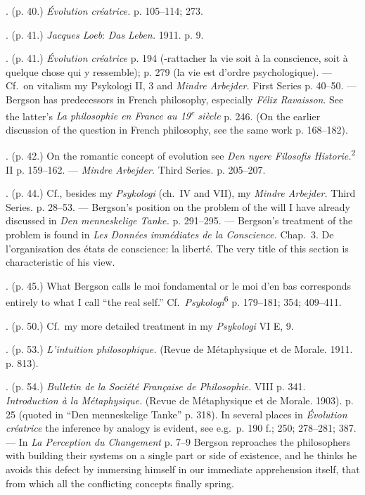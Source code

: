 \documentclass[12pt,a4paper,openany]{book}
\newcommand{\notelabel}[1]{\noindent #1}
\begin{document}
\begin{small}
\notelabel{34.} (p. 40.) \textit{Évolution créatrice.} p. 105--114; 273.

\notelabel{35.} (p. 41.) \emph{Jacques Loeb}: \textit{Das Leben.} 1911. p. 9.

\notelabel{36.} (p. 41.) \textit{Évolution créatrice} p. 194 (-rattacher %
la vie soit à la conscience, soit à quelque chose qui y ressemble); p. 279 (la vie est d'ordre psychologique). --- Cf.\ on vitalism my Psykologi II, 3 and \textit{Mindre Arbejder.} First Series p. 40--50. --- Bergson has predecessors in French philosophy, especially \emph{Félix Ravaisson}. See the latter's \textit{La philosophie en France au 19\textsuperscript{e} siècle} p. 246. (On the earlier discussion of the question in French philosophy, see the same work p. 168--182).

\notelabel{37.} (p. 42.) On the romantic concept of evolution see \textit{Den nyere Filosofis Historie.}\textsuperscript{2} II p. 159--162. --- \textit{Mindre Arbejder.} Third Series. p. 205--207.

\notelabel{38.} (p. 44.) Cf., besides my \textit{Psykologi} (ch.\ IV and VII), my \textit{Mindre Arbejder.} Third Series. p. 28--53. --- Bergson's position on the problem of the will I have already discussed in \textit{Den menneskelige Tanke.} p. 291--295. --- Bergson's treatment of the problem is found in \textit{Les Données immédiates de la Conscience.} Chap.\ 3. De l'organisation des états de conscience: la liberté. The very title of this section is characteristic of his view.

\notelabel{39.} (p. 45.) What Bergson calls le moi fondamental or le moi d'en bas corresponds entirely to what I call ``the real self.'' Cf.\ \textit{Psykologi}\textsuperscript{6} p. 179--181; 354; 409--411.

\notelabel{40.} (p. 50.) Cf.\ my more detailed treatment in my \textit{Psykologi} VI E, 9.

\notelabel{41.} (p. 53.) \textit{L'intuition philosophique.} (Revue de Métaphysique et de Morale. 1911. p. 813).

\notelabel{42.} (p. 54.) \textit{Bulletin de la Société Française de Philosophie.} VIII p. 341. \textit{Introduction à la Métaphysique.} (Revue de Métaphysique et de Morale. 1903). p. 25 (quoted in ``Den menneskelige Tanke'' p. 318). In several places in \textit{Évolution créatrice} the inference by analogy is evident, see e.g.\ p. 190 f.; 250; 278--281; 387. --- In \textit{La Perception du Changement} p. 7--9 Bergson reproaches the philosophers with building their systems on a single part or side of existence, and he thinks he avoids this defect by immersing himself in our immediate apprehension itself, that from which all the conflicting concepts finally spring.


\end{small}
\end{document}
